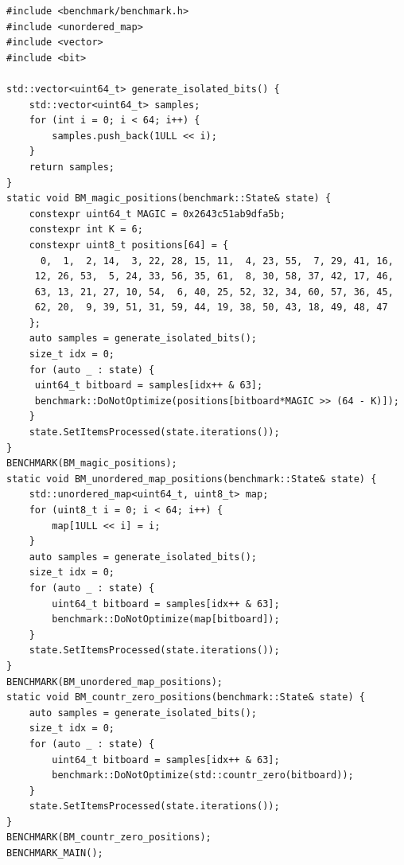\documentclass[12pt,a4paper,twoside,openright]{book}
\begin{document}
\begin{mdframed}[skipabove=\baselineskip,hidealllines=true]
\begin{verbatim}
#include <benchmark/benchmark.h>
#include <unordered_map>
#include <vector>
#include <bit>

std::vector<uint64_t> generate_isolated_bits() {
    std::vector<uint64_t> samples;
    for (int i = 0; i < 64; i++) {
        samples.push_back(1ULL << i);
    }
    return samples;
}
static void BM_magic_positions(benchmark::State& state) {
    constexpr uint64_t MAGIC = 0x2643c51ab9dfa5b;
    constexpr int K = 6;
    constexpr uint8_t positions[64] = {
      0,  1,  2, 14,  3, 22, 28, 15, 11,  4, 23, 55,  7, 29, 41, 16,
     12, 26, 53,  5, 24, 33, 56, 35, 61,  8, 30, 58, 37, 42, 17, 46,
     63, 13, 21, 27, 10, 54,  6, 40, 25, 52, 32, 34, 60, 57, 36, 45,
     62, 20,  9, 39, 51, 31, 59, 44, 19, 38, 50, 43, 18, 49, 48, 47
    };
    auto samples = generate_isolated_bits();
    size_t idx = 0;
    for (auto _ : state) {
     uint64_t bitboard = samples[idx++ & 63];
     benchmark::DoNotOptimize(positions[bitboard*MAGIC >> (64 - K)]);
    }
    state.SetItemsProcessed(state.iterations());
}
BENCHMARK(BM_magic_positions);
static void BM_unordered_map_positions(benchmark::State& state) {
    std::unordered_map<uint64_t, uint8_t> map;
    for (uint8_t i = 0; i < 64; i++) {
        map[1ULL << i] = i;
    }
    auto samples = generate_isolated_bits();
    size_t idx = 0;
    for (auto _ : state) {
        uint64_t bitboard = samples[idx++ & 63];
        benchmark::DoNotOptimize(map[bitboard]);
    }
    state.SetItemsProcessed(state.iterations());
}
BENCHMARK(BM_unordered_map_positions);
static void BM_countr_zero_positions(benchmark::State& state) {
    auto samples = generate_isolated_bits();
    size_t idx = 0;
    for (auto _ : state) {
        uint64_t bitboard = samples[idx++ & 63];
        benchmark::DoNotOptimize(std::countr_zero(bitboard));
    }
    state.SetItemsProcessed(state.iterations());
}
BENCHMARK(BM_countr_zero_positions);
BENCHMARK_MAIN();
\end{verbatim}
\label{lst:compare_hashmap_magic}
\end{mdframed}
\end{document}
